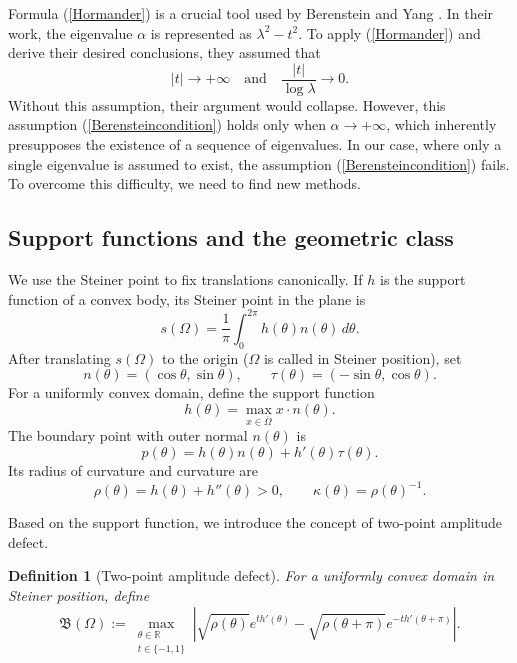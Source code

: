 \documentclass[12pt]{article}
\newcommand{\R}{\mathbb{R}}
\numberwithin{equation}{section}
\newtheorem{definition}[theorem]{Definition}
\numberwithin{equation}{section}
\begin{document}
Formula (\ref{Hormander}) is a crucial tool used by Berenstein and Yang \cite{Berenstein2}. In their work, the eigenvalue
$\alpha$ is represented as $\lambda^2-t^2$. To apply (\ref{Hormander}) and derive their desired conclusions, they assumed that
\begin{equation}\label{Berensteincondition}
|t|\rightarrow+\infty\quad \text{and} \quad \frac{|t|}{\log \lambda} \to 0.
\end{equation}
Without this assumption, their argument would collapse. However, this assumption (\ref{Berensteincondition}) holds only when
$\alpha\rightarrow+\infty$, which inherently presupposes the existence of a sequence of eigenvalues.
In our case, where only a single eigenvalue is assumed to exist, the assumption (\ref{Berensteincondition}) fails. To overcome this difficulty, we need to find new methods.
\subsection{Support functions and the geometric class}

We use the Steiner point to fix translations canonically. If $h$ is the
support function of a convex body, its Steiner point in the plane is
\begin{equation}\label{eq:Steiner}
s(\Omega)=\frac1\pi\int_0^{2\pi}h(\theta)n(\theta)\,d\theta.
\end{equation}
After translating $s(\Omega)$ to the origin ($\Omega$ is called in Steiner position), set
\begin{equation*}
n(\theta)=(\cos\theta,\sin\theta),\qquad
\tau(\theta)=(-\sin\theta,\cos\theta).
\end{equation*}
For a uniformly convex domain, define the support function
\begin{equation*}\label{eq:support}
h(\theta)=\max_{x\in\overline\Omega}x\cdot n(\theta).
\end{equation*}
The boundary point with outer normal $n(\theta)$ is
\begin{equation}\label{eq:p}
p(\theta)=h(\theta)n(\theta)+h'(\theta)\tau(\theta).
\end{equation}
Its radius of curvature and curvature are
\begin{equation*}\label{eq:rho}
\rho(\theta)=h(\theta)+h''(\theta)>0,\qquad
\kappa(\theta)=\rho(\theta)^{-1}.
\end{equation*}

Based on the support function, we introduce the concept of two-point amplitude defect.
\begin{definition}[Two-point amplitude defect]\label{def:defect}
\emph{For a uniformly convex domain in Steiner position, define}
\begin{equation}\label{eq:defect}
\mathfrak B(\Omega)
:=
\max_{\substack{\theta\in\R\\ t\in\{-1,1\}}}
\left|
\sqrt{\rho(\theta)}e^{t h'(\theta)}
-\sqrt{\rho(\theta+\pi)}e^{-t h'(\theta+\pi)}
\right|.
\end{equation}
\end{definition}
\end{document}
